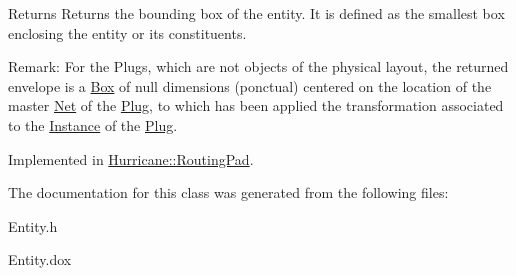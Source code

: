 \begin{DoxyReturn}{Returns}
Returns the bounding box of the entity. It is defined as the smallest box enclosing the entity or its constituents.
\end{DoxyReturn}
\begin{DoxyParagraph}{Remark\-:}
For the Plugs, which are not objects of the physical layout, the returned envelope is a \hyperlink{classHurricane_1_1Box}{Box} of null dimensions (ponctual) centered on the location of the master \hyperlink{classHurricane_1_1Net}{Net} of the \hyperlink{classHurricane_1_1Plug}{Plug}, to which has been applied the transformation associated to the \hyperlink{classHurricane_1_1Instance}{Instance} of the \hyperlink{classHurricane_1_1Plug}{Plug}. 
\end{DoxyParagraph}


Implemented in \hyperlink{classHurricane_1_1RoutingPad_a996f41b8d6a00263097342639002e3e5}{Hurricane\-::\-Routing\-Pad}.



The documentation for this class was generated from the following files\-:\begin{DoxyCompactItemize}
\item 
Entity.\-h\item 
Entity.\-dox\end{DoxyCompactItemize}
